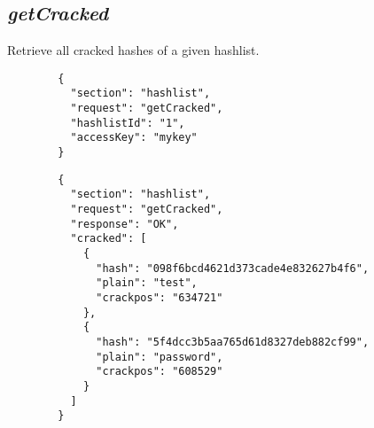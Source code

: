 \subsection*{\textit{getCracked}}
	Retrieve all cracked hashes of a given hashlist.
	{
		\color{blue}
		\begin{verbatim}
		{
		  "section": "hashlist",
		  "request": "getCracked",
		  "hashlistId": "1",
		  "accessKey": "mykey"
		}
		\end{verbatim}
	}
	{
		\color{OliveGreen}
		\begin{verbatim}
		{
		  "section": "hashlist",
		  "request": "getCracked",
		  "response": "OK",
		  "cracked": [
		    {
		      "hash": "098f6bcd4621d373cade4e832627b4f6",
		      "plain": "test",
		      "crackpos": "634721"
		    },
		    {
		      "hash": "5f4dcc3b5aa765d61d8327deb882cf99",
		      "plain": "password",
		      "crackpos": "608529"
		    }
		  ]
		}
		\end{verbatim}
	}






 